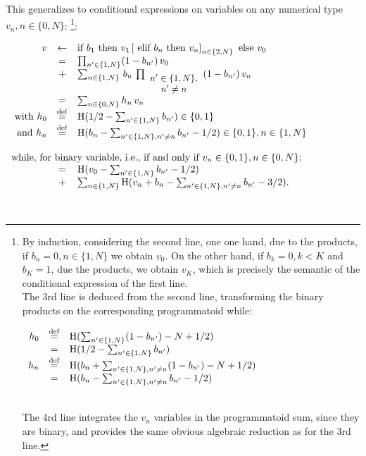 \documentclass[a4]{article} \usepackage[left=2cm,right=3cm,top=1cm,bottom=2cm]{geometry}
\newcommand{\eqline}[1]{~\vspace{0.1cm}\\\centerline{$#1$}\vspace{0.1cm}\\}
\newcommand{\defq}{\stackrel {\rm def}{=}}
\begin{document}
This generalizes to conditional expressions on variables on any numerical type $v_n, n \in \{0, N\}$: \footnote{
By induction, considering the second line, one one hand, due to the products, if $b_n = 0, n \in \{1, N\}$ we obtain $v_0$.
On the other hand, if $b_k = 0, k < K$ and $b_K = 1$, due the products, we obtain $v_K$, which is precisely the semantic
of the conditional expression of the first line. \\
The 3rd line is deduced from the second line, transforming the binary products on the corresponding programmatoid while:
\eqline{\begin{array}{rcl}
    h_0 &\defq& \mbox{H}(\sum_{n' \in \{1,  N\}} (1 - b_{n'}) - N + 1/2) \\ &=& \mbox{H}(1/2 - \sum_{n' \in \{1,  N\}} b_{n'})\\
    h_n &\defq& \mbox{H}(b_n + \sum_{n' \in \{1,  N\}, n' \ne n} (1 - b_{n'})  - N + 1/2) \\ &=& \mbox{H}(b_n - \sum_{n' \in \{1,  N\}, n' \ne n} b_{n'} - 1/2) \\
\end{array}}
The 4rd line integrates the $v_n$ variables in the programmatoid sum, since they are binary,
and provides the same obvious algebraic reduction as for the 3rd line.}: \eqline{\begin{array}{rcl}
v &\leftarrow& \mbox{if } b_1 \mbox{ then } v_1 \left[ \mbox{ elif } b_n \mbox{ then } v_n \right]_{n \in \{2, N\}} \mbox{ else } v_0 \\
    &=& \prod_{n' \in \{1,  N\}} (1 - b_{n'}) \, v_0  \\&+& \sum_{n \in \{1, N\}} \, b_n \, \prod_{\small \begin{array}{c}n' \in \{1,  N\}, \\ n' \ne n \\ \end{array}} (1 - b_{n'})  \, v_n  \\
   &=& \sum_{n \in \{0, N\}} h_n \, v_n \\
\mbox{ with } h_0 &\defq& \mbox{H}(1/2 - \sum_{n' \in \{1,  N\}} b_{n'})  \in \{0, 1\}\\
\mbox{ and } h_n &\defq&  \mbox{H}(b_n - \sum_{n' \in \{1,  N\}, n' \ne n} b_{n'} - 1/2) \in \{0, 1\}, n \in \{1, N\} \\
    &&\\ \multicolumn{3}{l}{\mbox{while, for binary variable, i.e., if and only if $v_n \in \{0, 1\},  n \in \{0, N\}$: }} \\
    &=& \mbox{H}(v_0 - \sum_{n' \in \{1,  N\}} b_{n'} - 1/2)  \\ &+& \sum_{n \in \{1, N\}} \mbox{H}(v_n + b_n - \sum_{n' \in \{1,  N\}, n' \ne n} b_{n'} - 3/2). \\
\end{array}}
\end{document}
